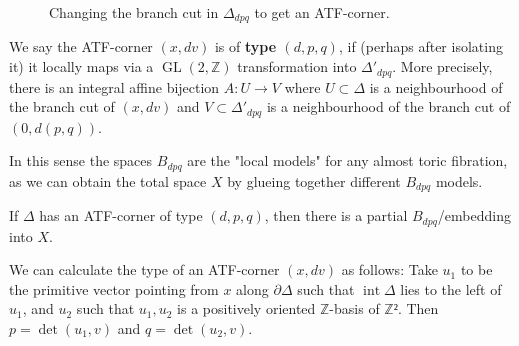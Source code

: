 \documentclass[12pt,a4paper,abstract=true,final]{scrartcl}
\DeclareMathOperator{\interior}{int}
\DeclareMathOperator{\GL}{GL}
\begin{document}
\begin{figure}
\centering
{}   
\caption{Changing the branch cut in $Δ_{dpq}$ to get an ATF-corner.}
\label{fig:Bdpq_moment_image_alt}
\end{figure}

\begin{definition}
  \label{def:atf_corner_type}
  We say the ATF-corner $(x,dv)$ is of \textbf{type $(d,p,q)$}, if (perhaps after isolating it) it locally maps via a $\GL(2,ℤ)$ transformation into $Δ'_{dpq}$. More precisely, there is an integral affine bijection $A\colon U → V$ where $U ⊂ Δ$ is a neighbourhood of the branch cut of $(x,dv)$ and $V ⊂ Δ'_{dpq}$ is a neighbourhood of the branch cut of $(0,d(p,q))$.
\end{definition}

In this sense the spaces $B_{dpq}$ are the "local models" for any almost toric fibration, as we can obtain the total space $X$ by glueing together different $B_{dpq}$ models.

\begin{lemma}
  \label{thm:atf_bdpq}
  If $Δ$ has an ATF-corner of type $(d,p,q)$, then there is a partial $B_{dpq}$\-/embedding into $X$.
\end{lemma}

\begin{remark}
  \label{rem:atf_corner_type_calc}
  We can calculate the type of an ATF-corner $(x,dv)$ as follows: Take $u_1$ to be the primitive vector pointing from $x$ along $∂Δ$ such that $\interior{Δ}$ lies to the left of $u_1$, and $u_2$ such that $u_1,u_2$ is a positively oriented $ℤ$-basis of $ℤ²$.
Then $p=\det(u_1,v)$ and $q = \det(u_2,v)$.
\end{remark}
\end{document}
